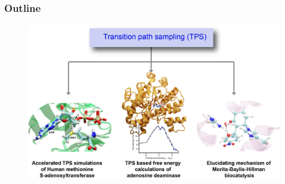\documentclass{beamer}
\begin{document}
%
\begin{frame}
  \frametitle{Outline}
  \begin{figure}
\centering
\includegraphics[scale=0.6]{figures/sree_outline.png}
  \end{figure}
\end{frame}
\end{document}
